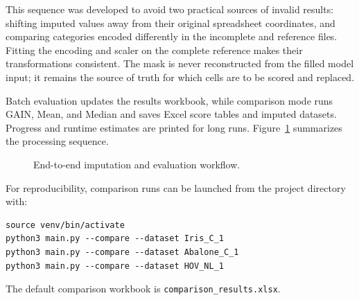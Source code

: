 \documentclass[11pt]{article}
\begin{document}
This sequence was developed to avoid two practical sources of invalid results: shifting imputed values away from their original spreadsheet coordinates, and comparing categories encoded differently in the incomplete and reference files. Fitting the encoding and scaler on the complete reference makes their transformations consistent. The mask is never reconstructed from the filled model input; it remains the source of truth for which cells are to be scored and replaced.

Batch evaluation updates the results workbook, while comparison mode runs GAIN, Mean, and Median and saves Excel score tables and imputed datasets. Progress and runtime estimates are printed for long runs. Figure~\ref{fig:workflow} summarizes the processing sequence.

\begin{figure}[ht]
\centering
{}
\caption{End-to-end imputation and evaluation workflow.}
\label{fig:workflow}
\end{figure}

For reproducibility, comparison runs can be launched from the project directory with:
\begin{verbatim}
source venv/bin/activate
python3 main.py --compare --dataset Iris_C_1
python3 main.py --compare --dataset Abalone_C_1
python3 main.py --compare --dataset HOV_NL_1
\end{verbatim}
The default comparison workbook is \texttt{comparison\_results.xlsx}.
\end{document}
